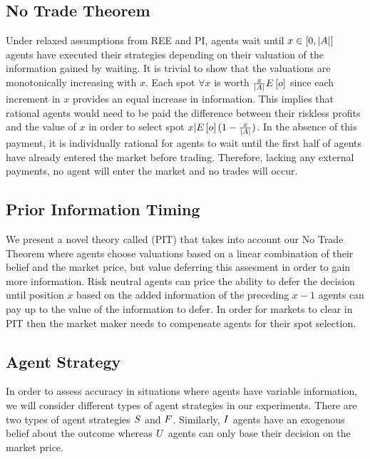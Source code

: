 \subsection{No Trade Theorem}
Under relaxed assumptions from REE and PI, agents wait until $x \in \left[0, |A| \right]$ agents have executed
their strategies depending on their valuation of the information gained by waiting. It is trivial to show that 
the valuations are monotonically increasing with $x$. 
Each spot  $\forall x$ is worth $\frac{x}{|A|} 
E\left[o\right]$ since each increment in $x$ provides an equal increase in information. This implies that rational agents
would need to be paid the difference between their riskless profits and the value of $x$ in order to select spot $x | E\left[o\right](1 - \frac{x}{|A|})$. In the absence of this payment, it is individually rational for agents to wait until the first half of agents have already entered the market before trading. Therefore, lacking any external payments, no agent will enter the market and no
trades will occur.

\subsection{Prior Information Timing}
We present a novel theory called  (PIT) that takes into account our No Trade
Theorem where agents choose valuations based on a linear combination of their belief and the market
price, but value deferring this assesment in order to gain more information. Risk neutral agents can
price the ability to defer the decision until position $x$ based on the added information of the 
preceding $x-1$ agents can pay up to the value of the information to defer. In order for markets
to clear in PIT then the market maker needs to compensate agents for their spot selection.\\

\subsection{Agent Strategy}
In order to assess accuracy in situations where agents have variable information, we will consider different types of agent strategies in our experiments. There are two types of agent strategies  $S$ and  $F$. Similarly,  $I$ agents have an exogenous belief about the outcome whereas  $U$ agents can only base their decision on the market price. \\

